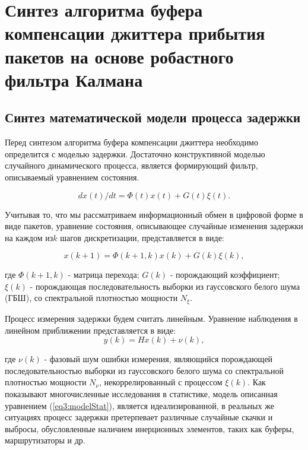 \chapter{Синтез алгоритма буфера компенсации джиттера прибытия пакетов на основе робастного фильтра Калмана} \label{chapt3}

\section{Синтез математической модели процесса задержки} \label{sect3_1}
Перед синтезом алгоритма буфера компенсации джиттера необходимо определится с моделью задержки. Достаточно конструктивной моделью случайного динамического процесса, является формирующий фильтр, описываемый уравнением состояния.

\begin{equation}\label{eq3:modelStatDif}
dx(t)/dt=\Phi(t)x(t)+G(t)\xi(t).
\end{equation}

Учитывая то, что мы рассматриваем информационный обмен в цифровой форме в виде пакетов, уравнение состояния, описывающее случайные изменения задержки на каждом из$k$ шагов дискретизации, представляется в виде:

\begin{equation}\label{eq3:modelStat}
x(k+1)=\Phi(k+1,k)x(k)+G(k)\xi(k),
\end{equation}

\noindent где $\Phi(k+1,k)$ - матрица перехода; $G(k)$ - порождающий коэффициент; $\xi(k)$ - порождающая последовательность выборки из гауссовского белого шума (ГБШ), со спектральной плотностью мощности $N_\xi$.

Процесс измерения задержки будем считать линейным. Уравнение наблюдения в линейном приближении представляется в виде:
\begin{equation}\label{eq3:Estim}
y(k)=Hx(k)+\nu(k),
\end{equation}

\noindent где $\nu(k)$ - фазовый шум ошибки измерения, являющийся порождающей последовательностью выборки из гауссовского белого шума со спектральной плотностью мощности $N_\nu$, некоррелированный с процессом $\xi(k)$. 
Как показывают многочисленные исследования в статистике, модель описанная уравнением (\ref{eq3:modelStat}), является идеализированной, в реальных же ситуациях процесс задержки претерпевает различные случайные скачки и выбросы, обусловленные наличием инерционных элементов, таких как буферы, маршрутизаторы и др.

